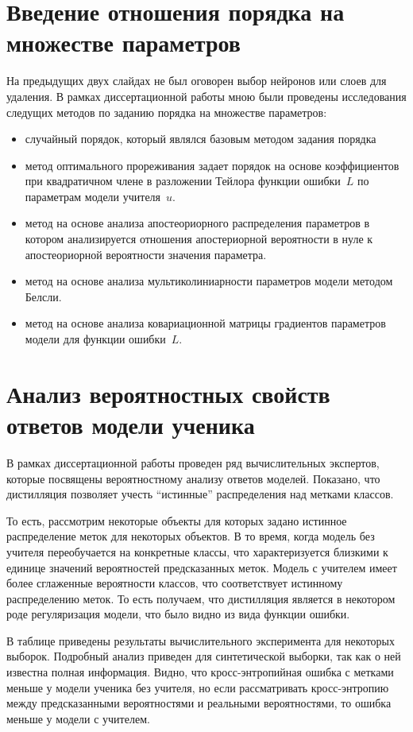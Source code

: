 \documentclass[10pt, twoside]{article}
\begin{document}
\section{Введение отношения порядка на множестве параметров}
На предыдущих двух слайдах не был оговорен выбор нейронов или слоев для удаления. В рамках диссертационной работы мною были проведены исследования следущих методов по заданию порядка на множестве параметров:
\begin{itemize}
    \item случайный порядок, который являлся базовым методом задания порядка
    \item метод оптимального прореживания задает порядок на основе коэффициентов при квадратичном члене в разложении Тейлора функции ошибки~$L$ по параметрам модели учителя~$u$.
    \item метод на основе анализа апостеориорного распределения параметров в котором анализируется отношения апостериорной вероятности в нуле к апостеориорной вероятности значения параметра.
    \item метод на основе анализа мультиколиниарности параметров модели методом Белсли.
    \item метод на основе анализа ковариационной матрицы градиентов параметров модели для функции ошибки~$L$.
\end{itemize}
\section{Анализ вероятностных свойств ответов модели ученика}
В рамках диссертационной работы проведен ряд вычислительных экспертов, которые посвящены вероятностному анализу ответов моделей. Показано, что дистилляция позволяет учесть ``истинные'' распределения над метками классов.

То есть, рассмотрим некоторые объекты для которых задано истинное распределение меток для некоторых объектов. В то время, когда модель без учителя переобучается на конкретные классы, что характеризуется близкими к единице значений вероятностей предсказанных меток. Модель с учителем имеет более сглаженные вероятности классов, что соответствует истинному распределению меток. То есть получаем, что дистилляция является в некотором роде регуляризация модели, что было видно из вида функции ошибки.

В таблице приведены результаты вычислительного эксперимента для некоторых выборок. Подробный анализ приведен для синтетической выборки, так как о ней известна полная информация. Видно, что кросс-энтропийная ошибка с метками меньше у модели ученика без учителя, но если рассматривать кросс-энтропию между предсказанными вероятностями и реальными вероятностями, то ошибка меньше у модели с учителем.
\end{document}
